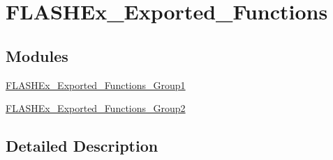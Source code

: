 \hypertarget{group___f_l_a_s_h_ex___exported___functions}{}\section{F\+L\+A\+S\+H\+Ex\+\_\+\+Exported\+\_\+\+Functions}
\label{group___f_l_a_s_h_ex___exported___functions}
\subsection*{Modules}
\begin{DoxyCompactItemize}
\item 
\hyperlink{group___f_l_a_s_h_ex___exported___functions___group1}{F\+L\+A\+S\+H\+Ex\+\_\+\+Exported\+\_\+\+Functions\+\_\+\+Group1}
\item 
\hyperlink{group___f_l_a_s_h_ex___exported___functions___group2}{F\+L\+A\+S\+H\+Ex\+\_\+\+Exported\+\_\+\+Functions\+\_\+\+Group2}
\end{DoxyCompactItemize}


\subsection{Detailed Description}
